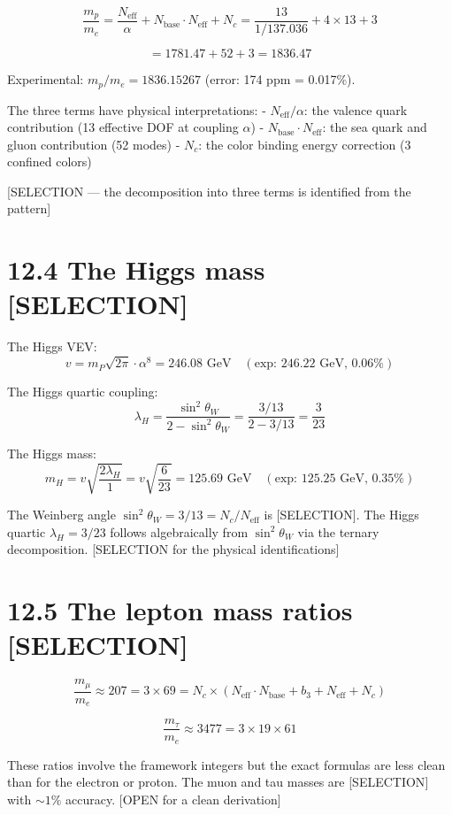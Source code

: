 \documentclass[
  11pt,
  letterpaper,
  twoside,
  openright]{book}
\begin{document}
\[
\frac{m_p}{m_e} = \frac{N_{\text{eff}}}{\alpha} + N_{\text{base}} \cdot N_{\text{eff}} + N_c = \frac{13}{1/137.036} + 4 \times 13 + 3
\tag{12.2}
\]

\[
= 1781.47 + 52 + 3 = 1836.47
\]

Experimental: \(m_p/m_e = 1836.15267\) (error: 174 ppm = 0.017\%).

The three terms have physical interpretations: -
\(N_{\text{eff}}/\alpha\): the valence quark contribution (13 effective
DOF at coupling \(\alpha\)) - \(N_{\text{base}} \cdot N_{\text{eff}}\):
the sea quark and gluon contribution (52 modes) - \(N_c\): the color
binding energy correction (3 confined colors)

{[}SELECTION --- the decomposition into three terms is identified from
the pattern{]}

\section{12.4 The Higgs mass
{[}SELECTION{]}}\label{the-higgs-mass-selection}

The Higgs VEV: \[
v = m_P \sqrt{2\pi} \cdot \alpha^8 = 246.08 \text{ GeV} \quad (\text{exp: } 246.22 \text{ GeV, 0.06\%})
\tag{12.3}
\]

The Higgs quartic coupling: \[
\lambda_H = \frac{\sin^2\theta_W}{2 - \sin^2\theta_W} = \frac{3/13}{2 - 3/13} = \frac{3}{23}
\tag{12.4}
\]

The Higgs mass: \[
m_H = v\sqrt{\frac{2\lambda_H}{1}} = v\sqrt{\frac{6}{23}} = 125.69 \text{ GeV} \quad (\text{exp: } 125.25 \text{ GeV, 0.35\%})
\tag{12.5}
\]

The Weinberg angle \(\sin^2\theta_W = 3/13 = N_c/N_{\text{eff}}\) is
{[}SELECTION{]}. The Higgs quartic \(\lambda_H = 3/23\) follows
algebraically from \(\sin^2\theta_W\) via the ternary decomposition.
{[}SELECTION for the physical identifications{]}

\section{12.5 The lepton mass ratios
{[}SELECTION{]}}\label{the-lepton-mass-ratios-selection}

\[
\frac{m_\mu}{m_e} \approx 207 = 3 \times 69 = N_c \times (N_{\text{eff}} \cdot N_{\text{base}} + b_3 + N_{\text{eff}} + N_c)
\]

\[
\frac{m_\tau}{m_e} \approx 3477 = 3 \times 19 \times 61
\]

These ratios involve the framework integers but the exact formulas are
less clean than for the electron or proton. The muon and tau masses are
{[}SELECTION{]} with \(\sim 1\%\) accuracy. {[}OPEN for a clean
derivation{]}
\end{document}
